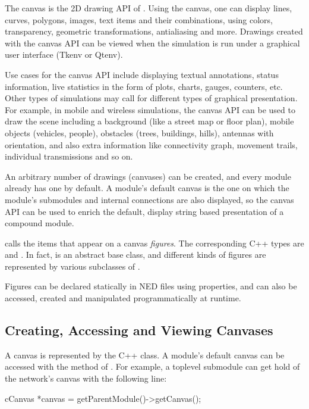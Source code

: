 The canvas is the 2D drawing API of {\opp}. Using the canvas, one can
display lines, curves, polygons, images, text items and their combinations,
using colors, transparency, geometric transformations, antialiasing and
more. Drawings created with the canvas API can be viewed when the simulation
is run under a graphical user interface (Tkenv or Qtenv).

Use cases for the canvas API include displaying textual annotations,
status information, live statistics in the form of plots, charts, gauges,
counters, etc. Other types of simulations may call for different types of
graphical presentation. For example, in mobile and wireless simulations,
the canvas API can be used to draw the scene including a background (like a
street map or floor plan), mobile objects (vehicles, people), obstacles
(trees, buildings, hills), antennas with orientation, and also extra
information like connectivity graph, movement trails, individual
transmissions and so on.

An arbitrary number of drawings (canvases) can be created, and every module
already has one by default. A module's default canvas is the one on which
the module's submodules and internal connections are also displayed, so the
canvas API can be used to enrich the default, display string based
presentation of a compound module.

{\opp} calls the items that appear on a canvas \textit{figures}. The
corresponding C++ types are  and . In fact,
 is an abstract base class, and different kinds of figures
are represented by various subclasses of .

Figures can be declared statically in NED files using 
properties, and can also be accessed, created and manipulated
programmatically at runtime.


\subsection{Creating, Accessing and Viewing Canvases}
\label{sec:graphics:creating-accessing-and-viewing-canvases}

A canvas is represented by the  C++ class. A module's
default canvas can be accessed with the  method of
. For example, a toplevel submodule can get hold of the
network's canvas with the following line:

\begin{cpp}
cCanvas *canvas = getParentModule()->getCanvas();
\end{cpp}

